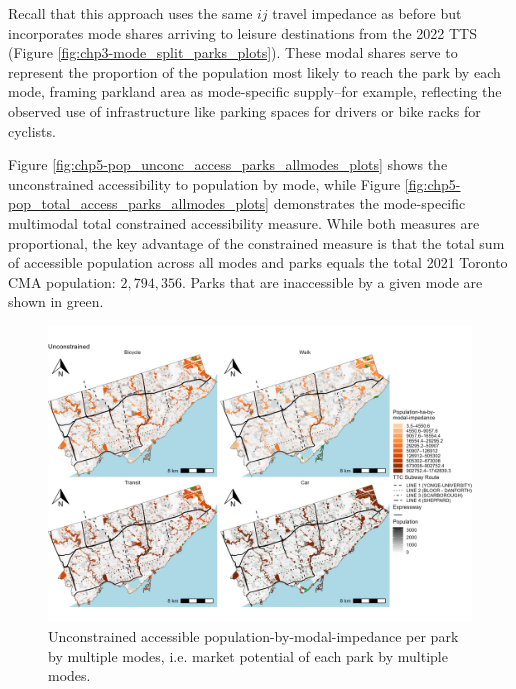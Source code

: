 \documentclass[
11pt, %
oneside, %
english, %
singlespacing, %
]{macthesis} %
\begin{document}
Recall that this approach uses the same \(ij\) travel impedance as before but incorporates mode shares arriving to leisure destinations from the 2022 TTS (Figure \ref{fig:chp3-mode_split_parks_plots}). These modal shares serve to represent the proportion of the population most likely to reach the park by each mode, framing parkland area as mode-specific supply--for example, reflecting the observed use of infrastructure like parking spaces for drivers or bike racks for cyclists.

Figure \ref{fig:chp5-pop_unconc_access_parks_allmodes_plots} shows the unconstrained accessibility to population by mode, while Figure \ref{fig:chp5-pop_total_access_parks_allmodes_plots} demonstrates the mode-specific multimodal total constrained accessibility measure. While both measures are proportional, the key advantage of the constrained measure is that the total sum of accessible population across all modes and parks equals the total 2021 Toronto CMA population: \(2,794,356\). Parks that are inaccessible by a given mode are shown in green.

\begin{figure}

{\centering \includegraphics[width=6in]{./data/figures/chp5-pop_unconc_access_parks_allmodes_plots} 

}

\caption{\label{fig:chp5-pop_unconc_access_parks_allmodes_plots} Unconstrained accessible population-by-modal-impedance per park by multiple modes, i.e. market potential of each park by multiple modes.}\label{fig:unnamed-chunk-86}
\end{figure}
\end{document}
